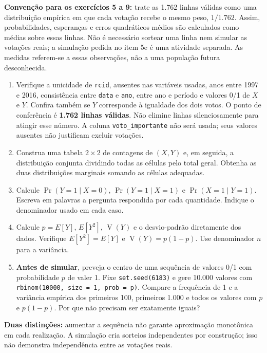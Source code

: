 \documentclass[
  brazilian,
  11pt,
  a4paper]{article}
\providecommand{\tightlist}{%
  \setlength{\itemsep}{0pt}\setlength{\parskip}{0pt}}
\begin{document}
\textbf{Convenção para os exercícios 5 a 9:} trate as 1.762 linhas
válidas como uma distribuição empírica em que cada votação recebe o
mesmo peso, \(1/1.762\). Assim, probabilidades, esperanças e erros
quadráticos médios são calculados como médias sobre essas linhas. Não é
necessário sortear uma linha nem simular as votações reais; a simulação
pedida no item 5e é uma atividade separada. As medidas referem-se a
essas observações, não a uma população futura desconhecida.

\begin{enumerate}
\def\labelenumi{\alph{enumi}.}
\tightlist
\item
  Verifique a unicidade de \texttt{rcid}, ausentes nas variáveis usadas,
  anos entre 1997 e 2016, consistência entre \texttt{data} e
  \texttt{ano}, entre ano e período e valores 0/1 de \(X\) e \(Y\).
  Confira também se \(Y\) corresponde à igualdade dos dois votos. O
  ponto de conferência é \textbf{1.762 linhas válidas}. Não elimine
  linhas silenciosamente para atingir esse número. A coluna
  \texttt{voto\_importante} não será usada; seus valores ausentes não
  justificam excluir votações.
\item
  Construa uma tabela \(2\times2\) de contagens de \((X,Y)\) e, em
  seguida, a distribuição conjunta dividindo todas as células pelo total
  geral. Obtenha as duas distribuições marginais somando as células
  adequadas.
\item
  Calcule \(\Pr(Y=1\mid X=0)\), \(\Pr(Y=1\mid X=1)\) e
  \(\Pr(X=1\mid Y=1)\). Escreva em palavras a pergunta respondida por
  cada quantidade. Indique o denominador usado em cada caso.
\item
  Calcule \(p=E[Y]\), \(E[Y^2]\), \(\operatorname{V}(Y)\) e o
  desvio-padrão diretamente dos dados. Verifique \(E[Y^2]=E[Y]\) e
  \(\operatorname{V}(Y)=p(1-p)\). Use denominador \(n\) para a
  variância.
\item
  \textbf{Antes de simular}, preveja o centro de uma sequência de
  valores 0/1 com probabilidade \(p\) de valer 1. Fixe
  \texttt{set.seed(6183)} e gere 10.000 valores com
  \texttt{rbinom(10000,\ size\ =\ 1,\ prob\ =\ p)}. Compare a frequência
  de 1 e a variância empírica dos primeiros 100, primeiros 1.000 e todos
  os valores com \(p\) e \(p(1-p)\). Por que não precisam ser exatamente
  iguais?
\end{enumerate}

\textbf{Duas distinções:} aumentar a sequência não garante aproximação
monotônica em cada realização. A simulação cria sorteios independentes
por construção; isso não demonstra independência entre as votações
reais.
\end{document}
